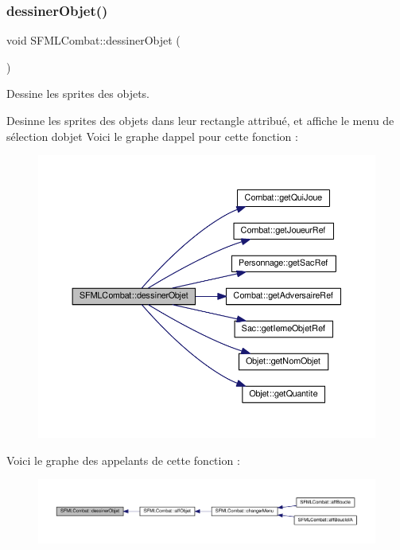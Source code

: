 \subsubsection{\texorpdfstring{dessiner\+Objet()}{dessinerObjet()}}
{\footnotesize\ttfamily void S\+F\+M\+L\+Combat\+::dessiner\+Objet (\begin{DoxyParamCaption}{ }\end{DoxyParamCaption})\hspace{0.3cm}{\ttfamily [private]}}



Dessine les sprites des objets. 

Desinne les sprites des objets dans leur rectangle attribué, et affiche le menu de sélection d\textquotesingle{}objet Voici le graphe d\textquotesingle{}appel pour cette fonction \+:\nopagebreak
\begin{figure}[H]
\begin{center}
\leavevmode
\includegraphics[width=350pt]{class_s_f_m_l_combat_a82520574af06d7d4bcb145f0a37fe691_cgraph}
\end{center}
\end{figure}
Voici le graphe des appelants de cette fonction \+:\nopagebreak
\begin{figure}[H]
\begin{center}
\leavevmode
\includegraphics[width=350pt]{class_s_f_m_l_combat_a82520574af06d7d4bcb145f0a37fe691_icgraph}
\end{center}
\end{figure}
\mbox{\label{class_s_f_m_l_combat_a22523f39138086a3b118a896ca214c4d}} 
